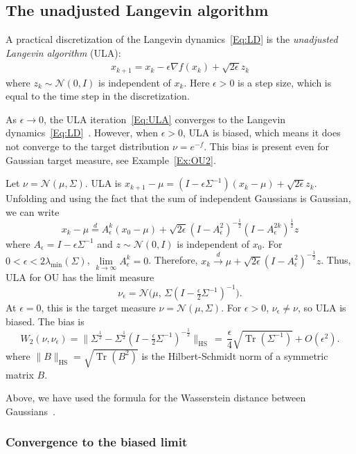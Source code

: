 \documentclass[final,12pt]{colt2018}
\newcommand{\N}{\mathcal{N}}
\newcommand{\HS}{\mathrm{HS}}
\DeclareMathOperator{\Tr}{Tr}
\begin{document}
\subsection{The unadjusted Langevin algorithm} 
\label{Sec:ULA}

A practical discretization of the Langevin dynamics~\eqref{Eq:LD} is the {\em unadjusted Langevin algorithm} (ULA):
\begin{align}\label{Eq:ULA}
x_{k+1} = x_k - \epsilon \nabla f(x_k) + \sqrt{2\epsilon} z_k
\end{align}
where $z_k \sim \N(0,I)$ is independent of $x_k$. 
Here $\epsilon > 0$ is a step size, which is equal to the time step in the discretization.

As $\epsilon \to 0$, the ULA iteration~\eqref{Eq:ULA} converges to the Langevin dynamics~\eqref{Eq:LD}~\citep[$\S11$]{Mac92}.
However, when $\epsilon > 0$, ULA is biased, which means it does not converge to the target distribution $\nu = e^{-f}$.
This bias is present even for Gaussian target measure, see Example~\ref{Ex:OU2}.


\begin{example}\label{Ex:OU2}
Let $\nu = \N(\mu,\Sigma)$.
ULA is $x_{k+1} - \mu = (I - \epsilon \Sigma^{-1})(x_k-\mu) + \sqrt{2\epsilon} z_k$.
Unfolding and using the fact that the sum of independent Gaussians is Gaussian, 
we can write
$$x_k - \mu \stackrel{d}{=} A_\epsilon^k(x_0-\mu) + \sqrt{2\epsilon} (I-A_\epsilon^2)^{-\frac{1}{2}} (I-A_\epsilon^{2k})^{\frac{1}{2}} z$$
where $A_\epsilon = I - \epsilon \Sigma^{-1}$ and $z \sim \N(0,I)$ is independent of $x_0$.
For $0 < \epsilon < 2\lambda_{\min}(\Sigma)$, 
$\lim\limits_{k \to \infty} A_\epsilon^k = 0$.
Therefore, $x_k \stackrel{d}{\to} \mu + \sqrt{2\epsilon} (I-A_\epsilon^2)^{-\frac{1}{2}} z$.
Thus, ULA for OU has the limit measure
$$\nu_\epsilon = \N\big(\mu,\,\Sigma(I - \tfrac{\epsilon}{2} \Sigma^{-1})^{-1}\big).$$
At $\epsilon = 0$, this is the target measure $\nu = \N(\mu,\Sigma)$.
For $\epsilon > 0$, $\nu_\epsilon \neq \nu$, so ULA is biased.
The bias is
$$W_2(\nu, \nu_\epsilon) = \|\Sigma^{\frac{1}{2}}-\Sigma^{\frac{1}{2}}(I - \tfrac{\epsilon}{2} \Sigma^{-1})^{-\frac{1}{2}}\|_{\HS} \,=\, \frac{\epsilon}{4} \sqrt{\Tr(\Sigma^{-1})} + O(\epsilon^2).$$
where $\|B\|_{\HS} = \sqrt{\Tr(B^2)}$ is the Hilbert-Schmidt norm of a symmetric matrix $B$.
\end{example}
Above, we have used the formula for the Wasserstein distance between Gaussians~\cite[]{T11}.


\subsubsection{Convergence to the biased limit}
\end{document}
